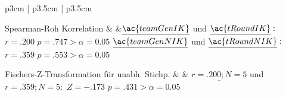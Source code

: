 \documentclass[a4paper,11pt]{article}%
\renewcommand{\\}{\vspace*{0.5\baselineskip} \newline}
\begin{document}
\begin{table}[H]
\begin{tabularx}{\textwidth}{p{3cm} | p{3.5cm} | p{3.5cm}}
		\hline 		
		
%		
		
		Spearman-Roh Korrelation 
		&
		&$\underline{\ac{teamGenIK}}$ und \newline $\underline{\ac{tRoundIK}}:$\newline
		$r=.200$\newline
		$p=.747>\alpha=0.05$\newline
		$\underline{\ac{teamGenNIK}}$ und $\underline{\ac{tRoundNIK}}:$\newline
		$r=.359$\newline
		$p=.553>\alpha=0.05$ \\
		
		\hline 		
		
%		
			
		Fischers-Z-Transformation für unabh. Stichp.
		&
		&  $\underline{r=.200; N=5}$ und $\underline{r=.359; N=5} :$\newline
		$Z=-.173$\newline
		$p=.431>\alpha=0.05$ \\
		
		\hline 	
	

\end{tabularx}
\end{table}
\end{document}
